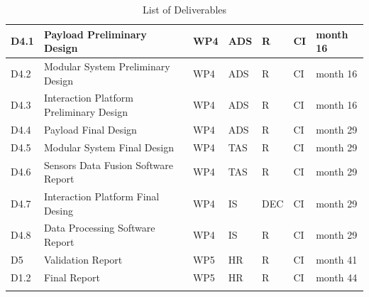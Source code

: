 \begin{longtable}[H]{p{1.8cm} p{2.2cm} p{1.3cm} p{1.8cm} p{1.1cm} p{2.1cm} p{1.8cm}}
	\midrule

 	D4.1 & Payload Preliminary Design  & WP4 & ADS & R & CI & month 16 \vspace{0.2cm} \\

 	\midrule

	D4.2 & Modular System Preliminary Design & WP4 & ADS & R & CI & month 16 \vspace{0.2cm} \\
	
	\midrule
	
	D4.3 & Interaction Platform Preliminary Design  & WP4 & ADS & R & CI & month 16 \vspace{0.2cm} \\

	\midrule

 	D4.4 & Payload Final Design & WP4 & ADS & R & CI & month 29  \vspace{0.2cm} \\

 	\midrule

	D4.5 & Modular System  Final Design & WP4 & TAS & R & CI & month 29  \vspace{0.2cm} \\
	
	\midrule
	
	D4.6 & Sensors Data Fusion Software Report  & WP4 & TAS & R & CI & month 29  \vspace{0.2cm} \\

	\midrule

 	D4.7 & Interaction Platform Final Desing  & WP4 & IS & DEC & CI & month 29 \vspace{0.2cm} \\

 	\midrule

	D4.8 & Data Processing Software Report & WP4 & IS & R & CI & month 29  \vspace{0.2cm} \\
	
	\midrule
	
	D5 & Validation Report & WP5 & HR & R & CI & month 41  \vspace{0.2cm} \\

	\midrule

 	D1.2 & Final Report & WP5 & HR & R & CI & month 44 \vspace{0.2cm} \\
	
	\bottomrule[2pt]
	
	\caption{List of Deliverables}
	\label{Deliverables}
\end{longtable}


